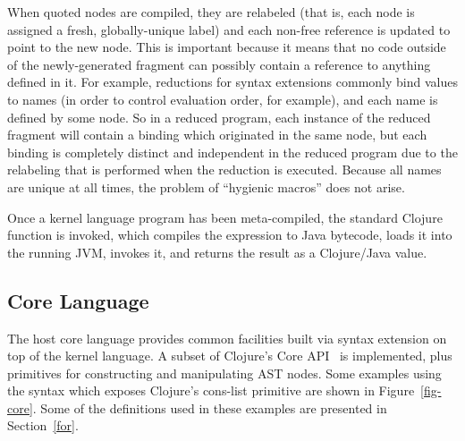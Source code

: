 When quoted nodes are compiled, they are relabeled (that is, each node is assigned a fresh, globally-unique label) and each non-free reference is updated to point to the new node. This is important because it means that no code outside of the newly-generated fragment can possibly contain a reference to anything defined in it. For example, reductions for syntax extensions commonly bind values to names (in order to control evaluation order, for example), and each name is defined by some  node. So in a reduced program, each instance of the reduced fragment will contain a binding which originated in the same node, but each binding is completely distinct and independent in the reduced program due to the relabeling that is performed when the reduction is executed. Because all names are unique at all times, the problem of ``hygienic macros''\cite{hygiene} does not arise.

Once a kernel language program has been meta-compiled, the standard Clojure function  is invoked, which compiles the expression to Java bytecode, loads it into the running JVM, invokes it, and returns the result as a Clojure/Java value. %


\subsection{Core Language}
The host core language provides common facilities built via syntax extension on top of the kernel language. 
A subset of Clojure's Core API~\cite{clojure-and} is implemented, plus primitives for constructing and manipulating AST nodes. Some examples using the syntax which exposes Clojure's cons-list primitive are shown in Figure~\ref{fig-core}. Some of the definitions used in these examples are presented in Section~\ref{for}.


